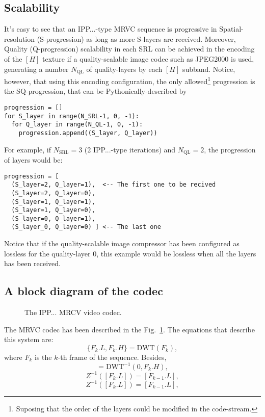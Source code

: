 \subsection{Scalability}
It's easy to see that an IPP...-type MRVC sequence is progressive in
Spatial-resolution (S-progression) as long as more S-layers are
received. Moreover, Quality (Q-progression) scalability in each SRL
can be achieved in the encoding of the $[H]$ texture if a
quality-scalable image codec such as JPEG2000 is used, generating a
number $N_{\text{QL}}$ of quality-layers by each $[H]$
subband. Notice, however, that using this encoding configuration, the
only allowed\footnote{Suposing that the order of the layers could be
modified in the code-stream.} progression is the SQ-progression, that
can be Pythonically-described by
\begin{verbatim}
progression = []
for S_layer in range(N_SRL-1, 0, -1):
  for Q_layer in range(N_QL-1, 0, -1):
    progression.append((S_layer, Q_layer))
\end{verbatim}

For example, if $N_{\text{SRL}}=3$ (2 IPP...-type iterations) and
$N_{\text{QL}}=2$, the progression of layers would be:
\begin{verbatim}
progression = [
  (S_layer=2, Q_layer=1),  <-- The first one to be recived
  (S_layer=2, Q_layer=0),
  (S_layer=1, Q_layer=1),
  (S_layer=1, Q_layer=0),
  (S_layer=0, Q_layer=1),
  (S_layer_0, Q_layer=0) ] <-- The last one
\end{verbatim}
Notice that if the quality-scalable image compressor has been
configured as lossless for the quality-layer 0, this example
would be lossless when all the layers has been received.

\subsection{A block diagram of the codec}
\begin{figure}
  \centering
  \caption{The IPP... MRCV video codec.}
  \label{fig:codec}
\end{figure}

The MRVC codec has been described in the Fig.~\ref{fig:codec}. The
equations that describe this system are:
\begin{equation}
  \{F_k.L, F_k.H\} = \text{DWT}(F_k),
  \tag{a}
\end{equation}
where $F_k$ is the $k$-th frame of the sequence.  Besides,
\begin{equation}
  [F_k.H] = \text{DWT}^{-1}(0, F_k.H),
  \tag{b}
\end{equation}
\begin{equation}
  Z^{-1}([F_k.L]) = [F_{k-1}.L],
  \tag{c}
\end{equation}
\begin{equation}
  Z^{-1}([F_k.L]) = [F_{k-1}.L],
  \tag{c}
\end{equation}


